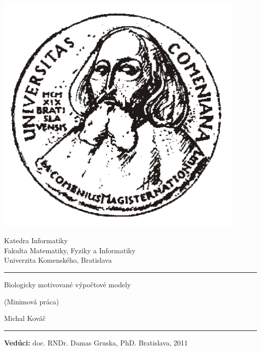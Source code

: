 \documentclass[12pt,oneside,openany,pagenumber=footcenter]{book}
\def\mftitlea{Biologicky motivované výpočtové modely}
\def\mfthesistype{Minimová práca}
\def\mfauthor{Michal Kováč}
\def\mfadvisor{doc. RNDr. Damas Gruska, PhD.}
\def\mfplacedate{Bratislava, 2011}
\begin{document}
\frontmatter
\thispagestyle{empty}
\begin{minipage}{0.20\textwidth}
\includegraphics[width=0.9\textwidth]{img/comenius_half.png}
\end{minipage}
\begin{minipage}{0.79\textwidth}
\begin{center}
\sc Katedra Informatiky \\
Fakulta Matematiky, Fyziky a Informatiky \\
Univerzita Komenského, Bratislava
\end{center}
\end{minipage}

\vfill
\begin{center}
\begin{minipage}{0.8\textwidth}
\hrule
\bigskip\bigskip
\centerline{\LARGE\sc\mftitlea}
\smallskip
\centerline{(\mfthesistype)}
\bigskip
\bigskip
\centerline{\large\sc\mfauthor}
\bigskip\bigskip
\hrule
\end{minipage}
\end{center}
\vfill
{\bf Vedúci:} \mfadvisor
\hfill\mfplacedate
\eject
\eject

\thispagestyle{empty}
{~}\vspace{12cm}




\tableofcontents{}
\listoffigures{}
\listoftables{}

\mainmatter
\end{document}
